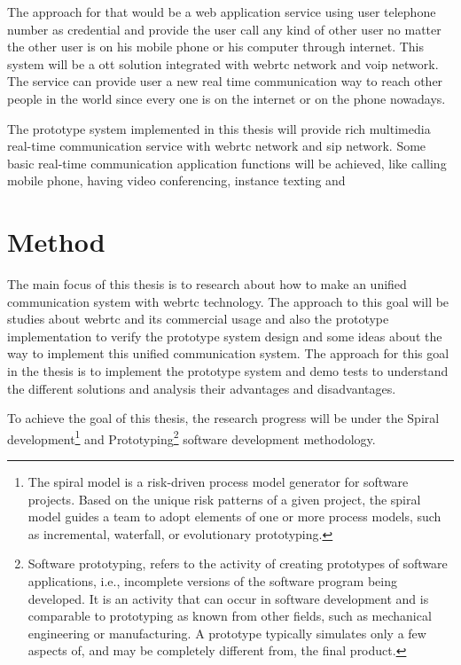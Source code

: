 \par The approach for that would be a web application service using user telephone number as credential and provide the user call any kind of other user no matter the other user is on his mobile phone or his computer through internet. This system will be a \gls{ott} solution integrated with \gls{webrtc} network and \gls{voip} network. The service can provide user a new real time communication way to reach other people in the world since every one is on the internet or on the phone nowadays.

\par The prototype system implemented in this thesis will provide rich multimedia real-time communication service with \gls{webrtc} network and \gls{sip} network. Some basic real-time communication application functions will be achieved, like calling mobile phone, having video conferencing, instance texting and 

\section{Method}

\noindent The main focus of this thesis is to research about how to make an unified communication system with \gls{webrtc} technology. The approach to this goal will be studies about \gls{webrtc} and its commercial usage and also the prototype implementation to verify the prototype system design and some ideas about the way to implement this unified communication system. The approach for this goal in the thesis is to implement the prototype system and demo tests to understand the different solutions and analysis their advantages and disadvantages.

\par To achieve the goal of this thesis, the research progress will be under the Spiral development\footnote{The spiral model is a risk-driven process model generator for software projects. Based on the unique risk patterns of a given project, the spiral model guides a team to adopt elements of one or more process models, such as incremental, waterfall, or evolutionary prototyping.\cite{wiki:spiral}} and Prototyping\footnote{Software prototyping, refers to the activity of creating prototypes of software applications, i.e., incomplete versions of the software program being developed. It is an activity that can occur in software development and is comparable to prototyping as known from other fields, such as mechanical engineering or manufacturing.
A prototype typically simulates only a few aspects of, and may be completely different from, the final product.\cite{wiki:prototyping}} software development methodology. 

